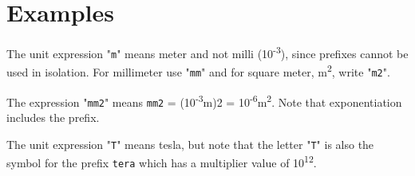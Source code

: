 \section{Examples}

The unit expression "\lstinline!m!" means meter and not milli
(10\textsuperscript{-3}), since prefixes cannot be used in isolation.
For millimeter use "\lstinline!mm!" and for square meter, m\textsuperscript{2}, write
"\lstinline!m2!".

The expression "\lstinline!mm2!" means \lstinline!mm2! = (10\textsuperscript{-3}m)2 =
10\textsuperscript{-6}m\textsuperscript{2}. Note that exponentiation
includes the prefix.

The unit expression "\lstinline!T!" means tesla, but note that the letter "\lstinline!T!" is
also the symbol for the prefix \lstinline!tera! which has a multiplier value of
10\textsuperscript{12}.

